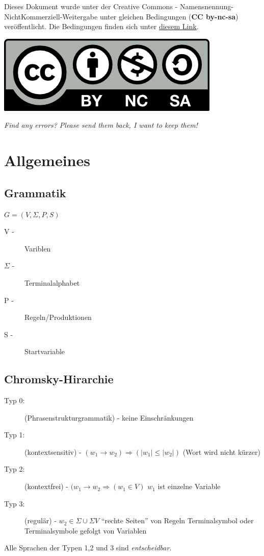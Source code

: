 \documentclass{scrartcl}
\begin{document}

\begin{shaded}
Dieses Dokument wurde unter der Creative Commons - Namensnennung-NichtKommerziell-Weitergabe unter gleichen Bedingungen (\textbf{CC by-nc-sa}) veröffentlicht. Die Bedingungen finden sich unter \href{http://creativecommons.org/licenses/by-nc-sa/3.0/de}{diesem Link}. \\
\centerline{\includegraphics[scale=1]{../cc-by-nc-sa.png} }
\end{shaded}

\textit{Find any errors? Please send them back, I want to keep them!}

\section*{Allgemeines}
\subsection*{Grammatik}
$G=(V,\Sigma,P,S)$ \\
\begin{description}
\item[V -] Variblen
\item[$\Sigma$ -] Terminalalphabet
\item[P -] Regeln/Produktionen
\item[S -] Startvariable
\end{description}

\subsection*{Chromsky-Hirarchie}
\begin{description}
\item[Typ 0:] (Phrasenstrukturgrammatik) - keine Einschränkungen
\item[Typ 1:] (kontextsensitiv) - $(w_1\to w_2) \Rightarrow (\vert w_1 \vert \leq \vert w_2 \vert)$ {\tiny (Wort wird nicht kürzer)}
\item[Typ 2:] (kontextfrei) - $(w_1\to w_2 \Rightarrow (w_1\in V)$ {\tiny $w_1$ ist einzelne Variable}
\item[Typ 3:] (regulär) - $w_2\in\Sigma\cup\Sigma V$ {\tiny "`rechte Seiten"' von Regeln Terminalsymbol oder Terminalsymbole gefolgt von Variablen}
\end{description}
Alle Sprachen der Typen 1,2 und 3 sind \emph{entscheidbar}.
\end{document}
